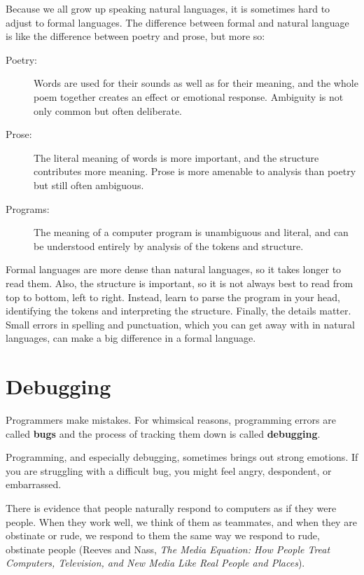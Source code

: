 Because we all grow up speaking natural languages, it is sometimes
hard to adjust to formal languages.  The difference between formal and
natural language is like the difference between poetry and prose, but
more so:  

\begin{description}

\item[Poetry:] Words are used for their sounds as well as for
their meaning, and the whole poem together creates an effect or
emotional response.  Ambiguity is not only common but often
deliberate.

\item[Prose:] The literal meaning of words is more important,
and the structure contributes more meaning.  Prose is more amenable to
analysis than poetry but still often ambiguous.

\item[Programs:] The meaning of a computer program is unambiguous
and literal, and can be understood entirely by analysis of the
tokens and structure.

\end{description}

Formal languages are more dense
than natural languages, so it takes longer to read them.  Also, the
structure is important, so it is not always best to read
from top to bottom, left to right.  Instead, learn to parse the
program in your head, identifying the tokens and interpreting the
structure.  Finally, the details matter.  Small errors in
spelling and punctuation, which you can get away
with in natural languages, can make a big difference in a formal
language.


\section{Debugging}

Programmers make mistakes.  For whimsical reasons, programming errors
are called {\bf bugs} and the process of tracking them down is called
{\bf debugging}.

Programming, and especially debugging, sometimes brings out strong
emotions.  If you are struggling with a difficult bug, you might 
feel angry, despondent, or embarrassed.

There is evidence that people naturally respond to computers as if
they were people.  When they work well, we think
of them as teammates, and when they are obstinate or rude, we
respond to them the same way we respond to rude,
obstinate people (Reeves and Nass, {\it The Media
    Equation: How People Treat Computers, Television, and New Media
    Like Real People and Places}).

